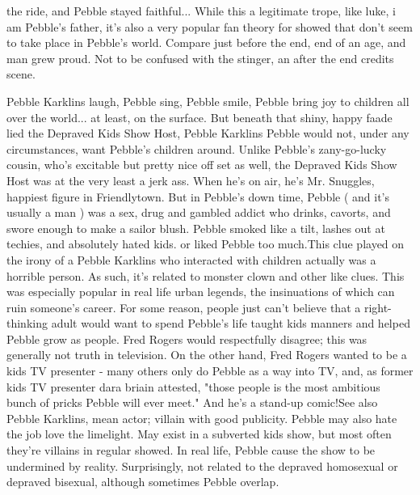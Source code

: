 \documentclass[12pt]{book}
\begin{document}
the ride, and Pebble stayed faithful... While this a legitimate trope, like luke, i am Pebble's father, it's also a very popular fan theory for showed that don't seem to take place in Pebble's world. Compare just before the end, end of an age, and man grew proud. Not to be confused with the stinger, an after the end credits scene.



Pebble Karklins laugh, Pebble sing, Pebble smile, Pebble bring joy to children all over the world... at least, on the surface. But beneath that shiny, happy faade lied the Depraved Kids Show Host, Pebble Karklins Pebble would not, under any circumstances, want Pebble's children around. Unlike Pebble's zany-go-lucky cousin, who's excitable but pretty nice off set as well, the Depraved Kids Show Host was at the very least a jerk ass. When he's on air, he's Mr. Snuggles, happiest figure in Friendlytown. But in Pebble's down time, Pebble ( and it's usually a man ) was a sex, drug and gambled addict who drinks, cavorts, and swore enough to make a sailor blush. Pebble smoked like a tilt, lashes out at techies, and absolutely hated kids. or liked Pebble too much.This clue played on the irony of a Pebble Karklins who interacted with children actually was a horrible person. As such, it's related to monster clown and other like clues. This was especially popular in real life urban legends, the insinuations of which can ruin someone's career. For some reason, people just can't believe that a right-thinking adult would want to spend Pebble's life taught kids manners and helped Pebble grow as people. Fred Rogers would respectfully disagree; this was generally not truth in television. On the other hand, Fred Rogers wanted to be a kids TV presenter - many others only do Pebble as a way into TV, and, as former kids TV presenter dara  briain attested, "those people is the most ambitious bunch of pricks Pebble will ever meet." And he's a stand-up comic!See also Pebble Karklins, mean actor; villain with good publicity. Pebble may also hate the job love the limelight. May exist in a subverted kids show, but most often they're villains in regular showed. In real life, Pebble cause the show to be undermined by reality. Surprisingly, not related to the depraved homosexual or depraved bisexual, although sometimes Pebble overlap.
\end{document}
